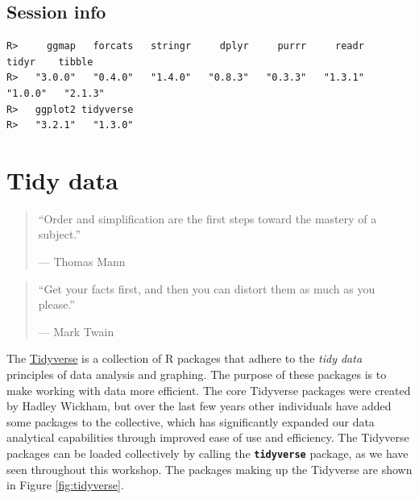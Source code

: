 \documentclass[
]{book}
\newenvironment{Shaded}{\begin{snugshade}}{\end{snugshade}}
\newcommand{\KeywordTok}[1]{\textcolor[rgb]{0.13,0.29,0.53}{\textbf{#1}}}
\newcommand{\NormalTok}[1]{#1}
\newcommand{\OperatorTok}[1]{\textcolor[rgb]{0.81,0.36,0.00}{\textbf{#1}}}
\newcommand{\StringTok}[1]{\textcolor[rgb]{0.31,0.60,0.02}{#1}}
\begin{document}
\hypertarget{session-info-8}{%
\section{Session info}\label{session-info-8}}

\begin{Shaded}
\end{Shaded}

\begin{verbatim}
R>     ggmap   forcats   stringr     dplyr     purrr     readr     tidyr    tibble 
R>   "3.0.0"   "0.4.0"   "1.4.0"   "0.8.3"   "0.3.3"   "1.3.1"   "1.0.0"   "2.1.3" 
R>   ggplot2 tidyverse 
R>   "3.2.1"   "1.3.0"
\end{verbatim}

\hypertarget{tidy}{%
\chapter{Tidy data}\label{tidy}}

\begin{quote}
``Order and simplification are the first steps toward the mastery of a subject.''

--- Thomas Mann
\end{quote}

\begin{quote}
``Get your facts first, and then you can distort them as much as you please.''

--- Mark Twain
\end{quote}

The \href{http://tidyverse.org}{Tidyverse} is a collection of R packages that adhere to the \emph{tidy data} principles of data analysis and graphing. The purpose of these packages is to make working with data more efficient. The core Tidyverse packages were created by Hadley Wickham, but over the last few years other individuals have added some packages to the collective, which has significantly expanded our data analytical capabilities through improved ease of use and efficiency. The Tidyverse packages can be loaded collectively by calling the \textbf{\texttt{tidyverse}} package, as we have seen throughout this workshop. The packages making up the Tidyverse are shown in Figure \ref{fig:tidyverse}.
\end{document}
